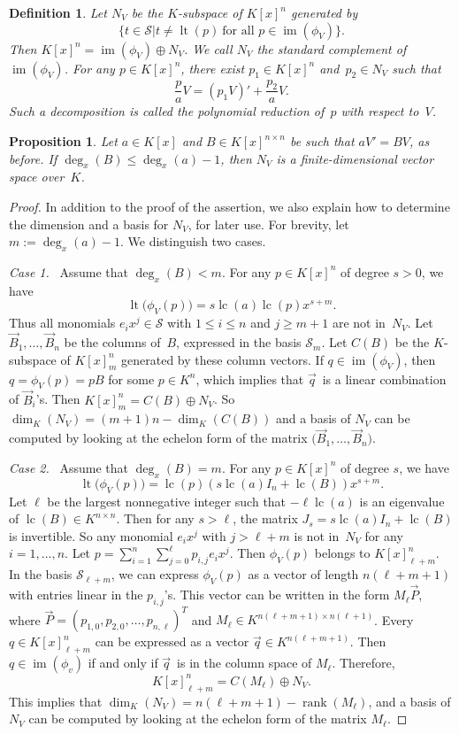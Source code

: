 \documentclass{sig-alternate}
\newtheorem{prop}[theorem]{Proposition}
\newtheorem{defi}[theorem]{Definition}
\newcommand{\cS}{ {\mathcal S}}
\def\lc{\operatorname{lc}}
\def\rank{\operatorname{rank}}
\def\lt{\operatorname{lt}}
\def\im{\operatorname{im}}
\begin{document}
\begin{defi}
Let $N_V$ be the $K$-subspace of $K[x]^n$ generated by
\[
  \bigl\{t \in \cS \mathrel{\big|} t \neq \lt(p) \ \text{for all $p\in \im(\phi_V)$}\bigr\}.
\]
Then $K[x]^n = \im(\phi_V) \oplus N_V$.
We call $N_V$ the \emph{standard complement} of $\im(\phi_V)$.
For any $p\in K[x]^n$, there exist $p_1\in K[x]^n$ and~$p_2\in N_V$ such that
\[\frac{p}{a}V = (p_1V)' + \frac{p_2}{a}V.\]
Such a decomposition is called the \emph{polynomial reduction} of~$p$
with respect to~$V$.
\end{defi}

\begin{prop}\label{PROP:finite}
Let $a\in K[x]$ and $B\in K[x]^{n \times n}$ be such that $aV'=BV$, as before.
If $\deg_x(B) \leq \deg_x(a)-1$, then $N_V$ is a finite-dimensional
vector space over~$K$.
\end{prop}
\begin{proof}
In addition to the proof of the assertion, we also explain how to determine
the dimension and a basis for $N_V$, for later use. For brevity, let
$m:=\deg_x(a)-1$. We distinguish two cases.

\smallskip
{\it Case 1.}~
Assume that $\deg_x(B) < m$. For any $p\in K[x]^n$ of degree $s>0$, we have
\[
  \lt\bigl(\phi_V(p)\bigr) = s\lc(a)\lc(p)x^{s+m}.
\]
Thus all monomials $e_i x^j\in \cS$ with $1\leq i\leq n$ and $j\geq m+1$ are not in~$N_V$.
Let $\vec{B}_1, \ldots, \vec{B}_n$ be the columns of~$B$, expressed in the basis $\cS_m$.
Let $C(B)$ be the $K$-subspace of $K[x]_m^n$ generated by these column vectors.
If $q\in \im(\phi_V)$, then $q = \phi_V(p) = pB$ for some $p \in K^n$, which implies that
$\vec{q}\,$ is a linear combination of $\vec{B}_i$'s. Then $K[x]_m^n = C(B) \oplus N_V$.
So $\dim_K(N_V)= (m+1)n - \dim_K(C(B))$ and a basis of $N_V$ can be computed by
looking at the echelon form of the matrix $\bigl(\vec{B}_1, \ldots, \vec{B}_n\bigr)$.

\smallskip
{\it Case 2.}~
Assume that $\deg_x(B) =m$. For any $p\in K[x]^n$ of degree $s$, we have
\[
  \lt\bigl(\phi_V(p)\bigr) = \lc(p)(s\lc(a)I_n + \lc(B))x^{s+m}.
\]
Let $\ell$ be the largest nonnegative integer such that $-\ell \lc(a)$ is an
eigenvalue of $\lc(B)\in K^{n\times n}$. Then for any $s>\ell$,
the matrix $J_s = s\lc(a)I_n + \lc(B)$ is invertible. So any monomial $e_ix^j$ with $j> \ell+m$ is not in~$N_V$
for any $i=1, \ldots, n$. Let $p = \sum_{i=1}^n \sum_{j=0}^{\ell} p_{i, j} e_ix^j$.
Then $\phi_V(p)$ belongs to $K[x]_{\ell+m}^n$.
In the basis $\cS_{\ell+m}$, we can
express $\phi_V(p)$ as a vector of length ${n(\ell+m+1)}$ with entries linear in the $p_{i, j}$'s.
This vector can be written in the form $M_{\ell} \vec{P}$,
where $\vec{P} = (p_{1, 0}, p_{2, 0}, \ldots, p_{n, \ell})^T$ and $M_{\ell} \in K^{n(\ell+m +1) \times n(\ell+1)}$.
Every $q\in K[x]_{\ell+m}^n$ can be expressed as a vector $\vec{q} \in K^{n(\ell + m +1)}$.
Then $q\in\im(\phi_v)$ if and only if $\vec{q}\,$ is in the column space of $M_{\ell}$.
Therefore,
\[K[x]_{\ell+m}^n = C({M_{\ell}}) \oplus N_V. \]
This implies that $\dim_K(N_V) = n(\ell+m+1) - \rank({M_{\ell}})$, and
a basis of $N_V$ can be computed by
looking at the echelon form of the matrix ${M_{\ell}}$.
\end{proof}
\end{document}
